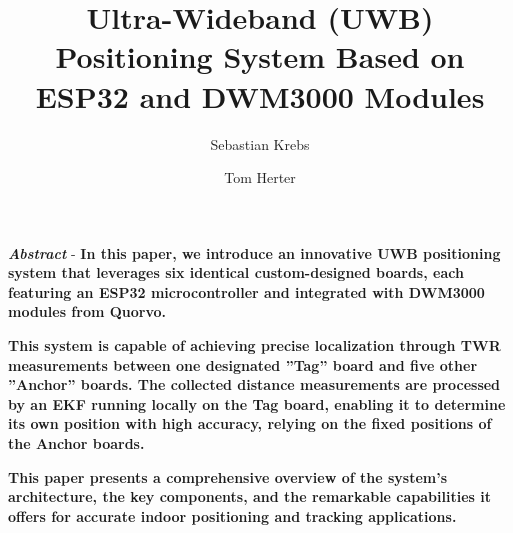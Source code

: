 \documentclass[10pt,a4paper,twocolumn]{article}
\begin{document}
\providecommand{\ShortAuthorList}[0]{S. Krebs, T. Herter} %
\title{Ultra-Wideband (UWB) Positioning System Based on ESP32 and DWM3000 Modules}
\author[1]{Sebastian Krebs}
\author[1]{Tom Herter}

\date{\dateline{\today}}

\maketitle
\vspace*{-1.3cm}

\section*{}
\textbf{\textit{Abstract}} - \textbf{
  In this paper, we introduce an innovative \ac{UWB} positioning system
  that leverages six identical custom-designed boards,
  each featuring an ESP32 microcontroller and integrated with DWM3000
  modules from Quorvo.}

  \textbf{This system is capable of achieving precise localization through \ac{TWR}
  measurements between one designated ''Tag'' board and five other ''Anchor'' boards.
  The collected distance measurements are processed by an \ac{EKF} running locally
  on the Tag board, enabling it to determine its own position with high accuracy,
  relying on the fixed positions of the Anchor boards.}

  \textbf{This paper presents a comprehensive overview of the system's architecture,
  the key components, and the remarkable capabilities it offers for accurate
  indoor positioning and tracking applications.}

\vspace*{.28cm}
\end{document}
